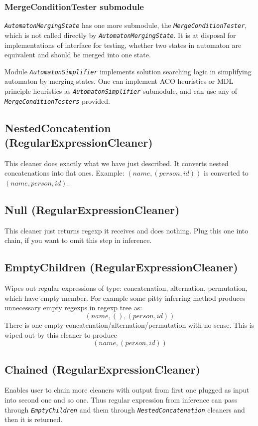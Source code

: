 \documentclass[a4paper,10pt,oneside]{article}
\newcommand{\code}[1]{\texttt{\StrSubstitute{#1}{.}{.\.}}}
\def\.{\discretionary{}{}{}}
\newcommand{\jmodule}[1]{\texttt{\textit{#1}}}
\begin{document}
\subsubsection{MergeConditionTester submodule}
\jmodule{AutomatonMergingState} has one more submodule, the \jmodule{MergeConditionTester}, which is not called directly by \jmodule{Au\.to\.ma\.ton\.Merg\.ing\.Sta\.te}.
It is at disposal for implementations of \code{AutomatonSimplifier} interface for testing, whether two states in automaton are equivalent and should be merged into one state.

Module \jmodule{AutomatonSimplifier} implements solution searching logic in simplifying automaton by merging states.
One can implement ACO heuristics or MDL principle heuristics as \jmodule{AutomatonSimplifier} submodule, and can use any of \jmodule{MergeConditionTesters} provided.

\subsection{NestedConcatention (RegularExpressionCleaner)} \label{section_NestedConcatention}
This cleaner does exactly what we have just described.
It converts nested concatenations into flat ones.
Example: $(name, (person, id))$ is converted to $(name, person, id)$.

\subsection{Null (RegularExpressionCleaner)} \label{section_Null}
This cleaner just returns regexp it receives and does nothing.
Plug this one into chain, if you want to omit this step in inference.

\subsection{EmptyChildren (RegularExpressionCleaner)} \label{section_EmptyChildren}
Wipes out regular expressions of type: concatenation, alternation, permutation, which have empty \code{children} member.
For example some pitty inferring method produces unnecessary empty regexps in regexp tree as:
$$
(name, (), (person, id))
$$
There is one empty concatenation/alternation/permutation with no sense.
This is wiped out by this cleaner to produce 
$$
(name, (person, id))
$$

\subsection{Chained (RegularExpressionCleaner)} \label{section_Chained}
Enables user to chain more cleaners with output from first one plugged as input into second one and so one.
Thus regular expression from inference can pass through \jmodule{EmptyChildren} and them through \jmodule{NestedConcatenation} cleaners and then it is returned.
\end{document}
